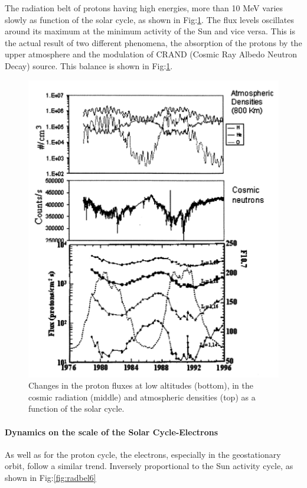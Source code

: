 \documentclass[./dissertation.tex]{subfiles}
\begin{document}
The radiation belt of protons having high energies, more than 10 MeV varies slowly as function of the solar cycle, as shown in Fig:\ref{fig:radbel5}. The flux levels oscillates around its maximum at the minimum activity of the Sun and vice versa. This is the actual result of two different phenomena, the absorption of the protons by the upper atmosphere and the modulation of CRAND (Cosmic Ray Albedo Neutron Decay) source. This balance is shown in Fig:\ref{fig:radbel5}.



\begin{figure}[h!]
\centering
  \includegraphics[scale = 0.50]{imgs/radbelt5.png}
  \caption{Changes in the proton fluxes at low altitudes (bottom), in the cosmic radiation (middle) and atmospheric densities (top) as a function of the solar cycle. \cite{bib2}}
  \label{fig:radbel5}
\end{figure}

\paragraph{Dynamics on the scale of the Solar Cycle-Electrons}
As well as for the proton cycle, the electrons, especially in the geostationary orbit, follow a similar trend. Inversely proportional to the Sun activity cycle, as shown in Fig:\ref{fig:radbel6}
\end{document}
